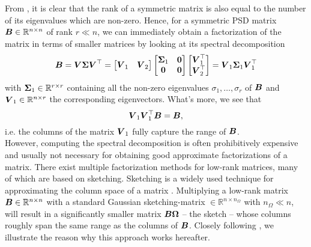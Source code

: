 From , it is clear that the rank of a symmetric
matrix is also equal to the number of its eigenvalues which are non-zero.
Hence, for a symmetric \gls{PSD} matrix $\boldsymbol{B} \in \mathbb{R}^{n \times n}$
of rank $r \ll n$, we can immediately obtain a factorization of the matrix in
terms of smaller matrices by looking at its spectral decomposition
\begin{equation}
    \boldsymbol{B}
        = \boldsymbol{V} \boldsymbol{\Sigma} \boldsymbol{V}^{\top} 
        = \begin{bmatrix} \boldsymbol{V}_1 & \boldsymbol{V}_2 \end{bmatrix} 
          \begin{bmatrix} \boldsymbol{\Sigma}_1 & \boldsymbol{0} \\ \boldsymbol{0} & \boldsymbol{0} \end{bmatrix} 
          \begin{bmatrix} \boldsymbol{V}_1^{\top} \\ \boldsymbol{V}_2^{\top} \end{bmatrix}
        = \boldsymbol{V}_1 \boldsymbol{\Sigma}_1 \boldsymbol{V}_1^{\top}
    \label{equ:3-nystrom-eigenvalue-decoposition}
\end{equation}
with $\boldsymbol{\Sigma}_1 \in \mathbb{R}^{r \times r}$ containing all the non-zero
eigenvalues $\sigma_1, \dots, \sigma_r$ of $\boldsymbol{B}$ and $\boldsymbol{V}_1 \in \mathbb{R}^{n \times r}$ the corresponding
eigenvectors. What's more, we see that
\begin{equation}
    \boldsymbol{V}_1 \boldsymbol{V}_1^{\top} \boldsymbol{B} = \boldsymbol{B},
    \label{equ:3-nystrom-range-captured}
\end{equation}
i.e. the columns of the matrix $\boldsymbol{V}_1$ fully capture the range of $\boldsymbol{B}$.\\

However, computing the spectral
decomposition is often prohibitively expensive and usually not necessary for
obtaining good approximate factorizations of a matrix. There exist multiple
factorization methods for low-rank matrices, many of which are based on sketching.
Sketching is a widely used technique for approximating the column space of a matrix
\cite{halko2011finding,woodruff2014sketching,lin2017randomized,tropp2017sketching,tropp2023randomized}.
Multiplying a low-rank matrix $\boldsymbol{B} \in \mathbb{R}^{n \times n}$ with a standard Gaussian
\gls{sketching-matrix} $\in \mathbb{R}^{n \times n_{\Omega}}$ with $n_{\Omega} \ll n$, will
result in a significantly smaller matrix $\boldsymbol{B}\boldsymbol{\Omega}$ -- the sketch -- whose
columns roughly span the same range as the columns of $\boldsymbol{B}$.
Closely following \cite[section~2.1]{tropp2023randomized}, we illustrate the
reason why this approach works hereafter.\\


